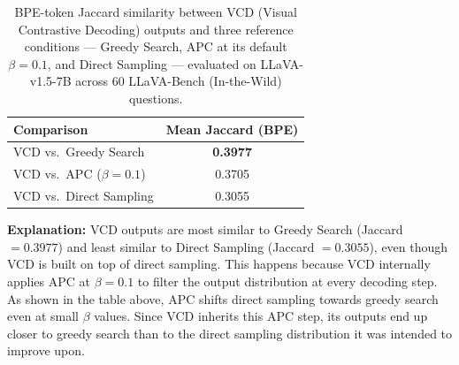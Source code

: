 \documentclass[11pt]{article}
\begin{document}
\begin{table}[ht]
\centering
\caption{BPE-token Jaccard similarity between VCD (Visual Contrastive Decoding) outputs and
three reference conditions --- Greedy Search, APC at its default $\beta{=}0.1$, and Direct
Sampling --- evaluated on LLaVA-v1.5-7B across 60 LLaVA-Bench (In-the-Wild) questions.}
\label{tab:jaccard_vcd}

\setlength{\tabcolsep}{14pt}
\renewcommand{\arraystretch}{1.2}

\begin{tabular}{lc}
\toprule
\textbf{Comparison} & \textbf{Mean Jaccard (BPE)} \\
\midrule
VCD vs.\ Greedy Search      & \textbf{0.3977} \\
VCD vs.\ APC ($\beta=0.1$)  & 0.3705 \\
VCD vs.\ Direct Sampling    & 0.3055 \\
\bottomrule
\end{tabular}

\medskip
\noindent
\textbf{Explanation:} VCD outputs are most similar to Greedy Search (Jaccard $= 0.3977$) and
least similar to Direct Sampling (Jaccard $= 0.3055$), even though VCD is built on top of
direct sampling. This happens because VCD internally applies APC at $\beta{=}0.1$ to filter
the output distribution at every decoding step. As shown in the table above, APC shifts direct
sampling towards greedy search even at small $\beta$ values. Since VCD inherits this APC step,
its outputs end up closer to greedy search than to the direct sampling distribution it was
intended to improve upon.

\end{table}
\end{document}
